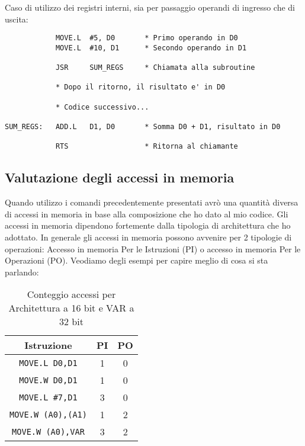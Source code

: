 Caso di utilizzo dei registri interni, sia per passaggio operandi di ingresso che di uscita:

\begin{lstlisting}
            MOVE.L  #5, D0       * Primo operando in D0
            MOVE.L  #10, D1      * Secondo operando in D1

            JSR     SUM_REGS     * Chiamata alla subroutine

            * Dopo il ritorno, il risultato e' in D0

            * Codice successivo...

SUM_REGS:   ADD.L   D1, D0       * Somma D0 + D1, risultato in D0

            RTS                  * Ritorna al chiamante

\end{lstlisting}

\subsection{Valutazione degli accessi in memoria}
Quando utilizzo i comandi precedentemente presentati avrò una quantità diversa di accessi in memoria in base alla composizione che ho dato al mio codice. Gli accessi in memoria dipendono fortemente dalla tipologia di architettura che ho adottato. In generale gli accessi in memoria possono avvenire per 2 tipologie di operazioni: Accesso in memoria Per le Istruzioni (PI) o accesso in memoria Per le Operazioni (PO).
Veodiamo degli esempi per capire meglio di cosa si sta parlando:
\begin{table}[h]
    \centering
    \begin{tabular}{|c|c|c|}
        \hline
        \textbf{Istruzione} & \textbf{PI} & \textbf{PO} \\
        \hline
        \lstinline|MOVE.L D0,D1| & 1 & 0 \\
        \lstinline|MOVE.W D0,D1| & 1 & 0 \\
        \lstinline|MOVE.L #7,D1| & 3 & 0 \\
        \lstinline|MOVE.W (A0),(A1)| & 1 & 2 \\
        \lstinline|MOVE.W (A0),VAR| & 3 & 2 \\
        \hline
    \end{tabular}
    \caption{Conteggio accessi per Architettura a 16 bit e VAR a 32 bit}
    \label{tab:esempio}
\end{table}


